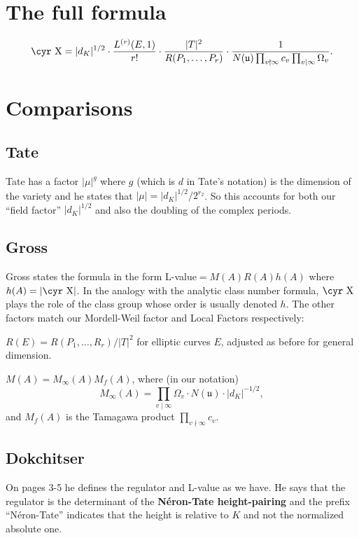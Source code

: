 \documentclass{amsart}
\newcommand{\Sha}{\text{\cyr X}}
\begin{document}
\section{The full formula}\label{the-full-formula}

\[
\Sha =
|d_K|^{1/2} \cdot \frac{L^{(r)}(E,1)}{r!} \cdot \frac{|T|^2}{R(P_1,\dots,P_r)} \cdot \frac{1}{N(\mathfrak{u}) \prod_{v\nmid\infty}c_v\prod_{v\mid\infty}\Omega_v}.\]

\section{Comparisons}\label{comparisons}

\subsection{Tate}\label{tate}

Tate has a factor \(|\mu|^g\) where \(g\) (which is \(d\) in Tate's
notation) is the dimension of the variety and he states that
\(|\mu|=|d_K|^{1/2}/2^{r_2}\). So this accounts for both our ``field
factor'' \(|d_K|^{1/2}\) and also the doubling of the complex periods.

\subsection{Gross}\label{gross}

Gross states the formula in the form L-value\(=M(A)R(A)h(A)\) where
\(h(A)=|\Sha|\). In the analogy with the analytic class
number formula, $\Sha$ plays the role of the class group whose order is
usually denoted \(h\). The other factors match our Mordell-Weil factor
and Local Factors respectively:

\(R(E)=R(P_1,\dots,R_r)/|T|^2\) for elliptic curves \(E\), adjusted as
before for general dimension.

\(M(A) = M_{\infty}(A)M_f(A)\), where (in our notation)
\[M_{\infty}(A) = \prod_{v\mid\infty}\Omega_v \cdot N(\mathfrak{u}) \cdot |d_K|^{-1/2},\]
and \(M_f(A)\) is the Tamagawa product \(\prod_{v\nmid\infty}c_v\).

\subsection{Dokchitser}\label{dokchitser}

On pages 3-5 he defines the regulator and L-value as we have. He says
that the regulator is the determinant of the \textbf{Néron-Tate
height-pairing} and the prefix ``Néron-Tate'' indicates that the height
is relative to \(K\) and not the normalized absolute one.
\end{document}
